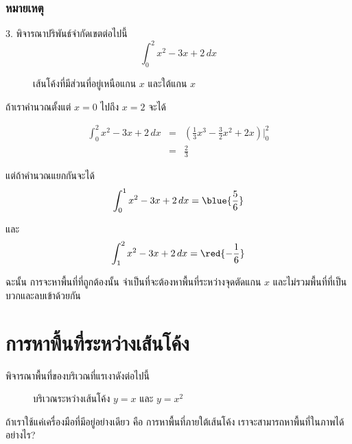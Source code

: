 \begin{frame}[t]
\frametitle{หมายเหตุ}
3. พิจารณาปริพันธ์จำกัดเขตต่อไปนี้
\[\int_0^2 x^2-3x + 2 \, dx\]

\begin{figure}[h!]
\centering
{}
\caption{เส้นโค้งที่มีส่วนที่อยู่เหนือแกน $x$ และใต้แกน $x$}
\end{figure}
\end{frame}

\begin{frame}[t]
ถ้าเราคำนวณตั้งแต่ $x=0$ ไปถึง $x=2$ จะได้
\begin{slide}
\begin{eqnarray*}
\int_0^2 x^2-3x + 2 \, dx &=& \left(\frac{1}{3}x^3 - \frac{3}{2}x^2 + 2x\right) \Big|_0^2 \\
&=& \frac{2}{3}
\end{eqnarray*}

แต่ถ้าคำนวณแยกกันจะได้
\[ \int_0^1 x^2-3x + 2 \, dx = \blue{\frac{5}{6}} \]

และ
\[ \int_1^2 x^2-3x + 2 \, dx = \red{-\frac{1}{6}} \]

ฉะนั้น การจะหาพื้นที่ที่ถูกต้องนั้น จำเป็นที่จะต้องหาพื้นที่ระหว่างจุดตัดแกน $x$ และไม่รวมพื้นที่ที่เป็นบวกและลบเข้าด้วยกัน
\end{slide}
\end{frame}


\section{การหาพื้นที่ระหว่างเส้นโค้ง}
\frame{\sectionpage}

\begin{frame}
พิจารณาพื้นที่ของบริเวณที่แรเงาดังต่อไปนี้

\begin{figure}[h!]
\centering
{}
\caption{บริเวณระหว่างเส้นโค้ง $y=x$ และ $y=x^2$}
\end{figure}

ถ้าเราใช้แค่เครื่องมือที่มีอยู่อย่างเดียว คือ การหาพื้นที่ภายใต้เส้นโค้ง เราจะสามารถหาพื้นที่ในภาพได้อย่างไร? \pa
\end{frame}

